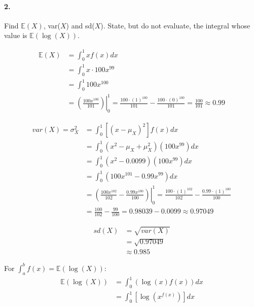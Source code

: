     \paragraph*{2.}
    Find $\mathbb{E}(X)$, var($X$) and sd($X$). State, but do not evaluate, the integral whose value is $\mathbb{E}(\log(X))$.
    \\
    \begin{mdframed}
        \begin{align*}
            \mathbb{E}(X)   & = \int_{0}^{1} xf(x)dx            \\
                            & = \int_{0}^{1} x \cdot 100x^{99}  \\
                            & = \int_{0}^{1} 100x^{100}         \\
                            & = \left.\left(\frac{100x^{100}}{101}\right)\right|_{0}^{1}
                              = \frac{100\cdot(1)^{100}}{101} - \frac{100\cdot(0)^{100}}{101}
                              = \frac{100}{101} \approx \boxed{0.99}
        \end{align*}

        \begin{align*}
            var(X) = \sigma^2_X & = \int_{0}^{1}\left[(x - \mu_X)^2\right]f(x)dx    \\
                                & = \int_{0}^{1}(x^2 - \mu_X + \mu_X^2)(100x^{99})dx\\
                                & = \int_{0}^{1}(x^2 - 0.0099)(100x^{99})dx         \\
                                & = \int_{0}^{1}(100x^{101} - 0.99x^{99})dx         \\
                                & = \left.\left(\frac{100x^{102}}{102} - \frac{0.99x^{100}}{100}\right)\right|_{0}^{1}
                                  = \frac{100\cdot(1)^{102}}{102} - \frac{0.99\cdot(1)^{100}}{100}   \\
                                & = \frac{100}{102} - \frac{99}{100} = 0.98039 - 0.0099 \approx \boxed{0.97049}
        \end{align*}

        \begin{align*}
            sd(X)   & = \sqrt{var(X)}   \\
                    & = \sqrt{0.97049}  \\
                    & \approx \boxed{0.985}
        \end{align*}
        
        For $\int_{a}^{b}f(x) = \mathbb{E}(\log(X))$:
        \begin{align*}
            \mathbb{E}(\log(X)) & = \int_{0}^{1}(\log(x)f(x))dx                         \\
                                & = \boxed{\int_{0}^{1}\left[\log\left(x^{f(x)}\right)\right]dx}
        \end{align*}
    \end{mdframed}

